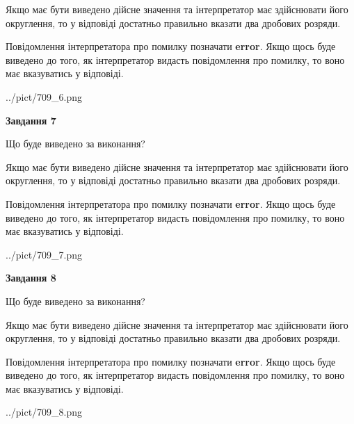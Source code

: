 \documentclass[12pt, ukrainian]{article}
\begin{document}
{\begin {Large}
Якщо має бути виведено дійсне значення та інтерпретатор має здійснювати його округлення, 
то у відповіді достатньо правильно вказати два дробових розряди.

Повідомлення інтерпретатора про помилку позначати \textbf{error}.
Якщо щось буде виведено до того, як інтерпретатор видасть повідомлення про помилку, 
то воно має вказуватись у відповіді. \par

\begin{center}
	{../pict/709_6.png}
\end{center}
\newpage

{\begin {center}\textbf{Завдання 7}\end {center}}\par
Що буде виведено за виконання? \par

Якщо має бути виведено дійсне значення та інтерпретатор має здійснювати його округлення, 
то у відповіді достатньо правильно вказати два дробових розряди.

Повідомлення інтерпретатора про помилку позначати \textbf{error}.
Якщо щось буде виведено до того, як інтерпретатор видасть повідомлення про помилку, 
то воно має вказуватись у відповіді. \par

\begin{center}
	{../pict/709_7.png}
\end{center}
\newpage

{\begin {center}\textbf{Завдання 8}\end {center}}\par
Що буде виведено за виконання? \par

Якщо має бути виведено дійсне значення та інтерпретатор має здійснювати його округлення, 
то у відповіді достатньо правильно вказати два дробових розряди.

Повідомлення інтерпретатора про помилку позначати \textbf{error}.
Якщо щось буде виведено до того, як інтерпретатор видасть повідомлення про помилку, 
то воно має вказуватись у відповіді. \par

\begin{center}
	{../pict/709_8.png}
\end{center}
\newpage


\end{Large}}
\end{document}
